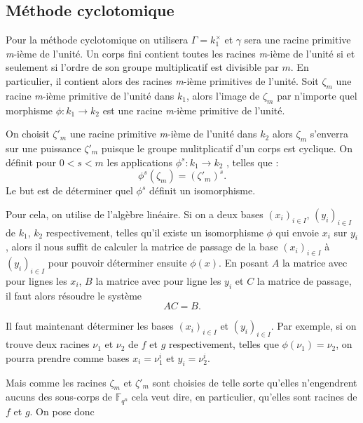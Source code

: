 \documentclass[a4paper]{article} %
\numberwithin{section}{part}
\numberwithin{equation}{section}
\newcommand\nroot[1]{\textit{#1}-ième}
\newcommand\GF[1]{\mathbb{F}_{#1}}
\begin{document}
\subsection{Méthode cyclotomique}

Pour la méthode cyclotomique on utilisera $\Gamma = k_1^{\times}$ et $\gamma$ 
sera une racine primitive \nroot{m} de l'unité.
Un corps fini contient toutes les racines \nroot{m} de l'unité si et seulement 
si l'ordre de son groupe multiplicatif est divisible par $m$. En particulier, il
contient alors des racines \nroot{m} primitives de l'unité. Soit $\zeta_m$ une
racine \nroot{m} primitive de l'unité dans $k_1$, alors l'image de $\zeta_m$ par
n'importe quel morphisme $\phi : k_1 \to k_2$ est une racine \nroot{m} primitive
de l'unité.\par
On choisit $\zeta'_m$ une racine primitive \nroot{m} de l'unité dans $k_2$
alors $\zeta_m$ s'enverra sur une puissance $\zeta'_m$ puisque le groupe 
mulitplicatif d'un corps est cyclique. On définit pour $0 < s < m$ les
applications $\phi^s : k_1 \to k_2$ , telles que :
\begin{equation}
\phi^s(\zeta_m) = (\zeta'_m)^s.
\end{equation}
Le but est de déterminer quel $\phi^s$ définit un isomorphisme.\par
Pour cela, on utilise de l'algèbre linéaire. Si on a deux bases 
$(x_i)_{i\in I}$, $(y_i)_{i\in I}$ de $k_1$, $k_2$ respectivement, telles 
qu'il existe un isomorphisme $\phi$ qui envoie $x_i$ sur $y_i$, alors il nous
suffit de calculer la matrice de passage de la base $(x_i)_{i\in I}$ à
$(y_i)_{i\in I}$ pour pouvoir déterminer ensuite $\phi(x)$. En posant $A$ la
matrice avec pour lignes les $x_i$, $B$ la matrice avec pour ligne les $y_i$ et
$C$ la matrice de passage, il faut alors résoudre le système 
\begin{equation}
AC = B.
\end{equation}
\par
Il faut maintenant déterminer les bases $(x_i)_{i\in I}$ et $(y_i)_{i\in I}$. 
Par exemple, si on trouve deux racines $\nu_1$ et $\nu_2$ de $f$ et $g$ 
respectivement, telles que $\phi(\nu_1) = \nu_2$, on pourra prendre comme bases 
$x_i = \nu_1^i$ et $y_i = \nu_2^i$.\par
Mais comme les racines $\zeta_m$ et $\zeta'_m$ sont choisies de telle sorte 
qu'elles n'engendrent aucuns des sous-corps de $\GF{q^n}$ cela veut 
dire, en particulier, qu'elles sont racines de $f$ et $g$. On pose donc 
\end{document}
